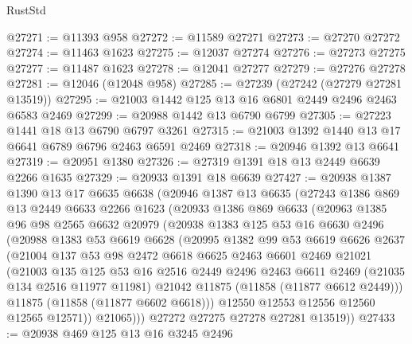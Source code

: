 \begin{lexlean}{RustStd}
\begin{coremodule}
@27271 := @11393 @958
@27272 := @11589 @27271
@27273 := @27270 @27272
@27274 := @11463 @1623
@27275 := @12037 @27274
@27276 := @27273 @27275
@27277 := @11487 @1623
@27278 := @12041 @27277
@27279 := @27276 @27278
@27281 := @12046 (@12048 @958)
@27285 := @27239 (@27242 (@27279 @27281 @13519))
@27295 := @21003 @1442 @125 @13 @16 @6801 @2449 @2496 @2463 @6583 @2469
@27299 := @20988 @1442 @13 @6790 @6799
@27305 := @27223 @1441 @18 @13 @6790 @6797 @3261
@27315 := @21003 @1392 @1440 @13 @17 @6641 @6789 @6796 @2463 @6591 @2469
@27318 := @20946 @1392 @13 @6641
@27319 := @20951 @1380
@27326 := @27319 @1391 @18 @13 @2449 @6639 @2266 @1635
@27329 := @20933 @1391 @18 @6639
@27427 := @20938
    @1387
    @1390
    @13
    @17
    @6635
    @6638
    (@20946
      @1387
      @13
      @6635
      (@27243
        @1386
        @869
        @13
        @2449
        @6633
        @2266
        @1623
        (@20933
          @1386
          @869
          @6633
          (@20963
            @1385
            @96
            @98
            @2565
            @6632
            @20979
            (@20938
              @1383
              @125
              @53
              @16
              @6630
              @2496
              (@20988
                @1383
                @53
                @6619
                @6628
                (@20995
                  @1382
                  @99
                  @53
                  @6619
                  @6626
                  @2637
                  (@21004
                    @137
                    @53
                    @98
                    @2472
                    @6618
                    @6625
                    @2463
                    @6601
                    @2469
                    @21021
                    (@21003
                      @135
                      @125
                      @53
                      @16
                      @2516
                      @2449
                      @2496
                      @2463
                      @6611
                      @2469
                      (@21035 @134 @2516 @11977 @11981)
                      @21042
                      @11875
                      (@11858 (@11877 @6612 @2449)))
                    @11875
                    (@11858 (@11877 @6602 @6618)))
                  @12550
                  @12553
                  @12556
                  @12560
                  @12565
                  @12571))
              @21065)))
        @27272
        @27275
        @27278
        @27281
        @13519))
@27433 := @20938 @469 @125 @13 @16 @3245 @2496

\end{coremodule}
\end{lexlean}
